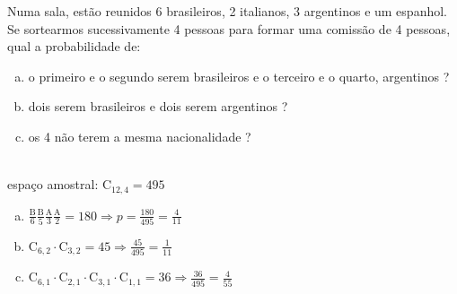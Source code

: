 \begin{ex}
	Numa sala, estão reunidos 6 brasileiros, 2 italianos, 3 argentinos e um espanhol. Se sortearmos sucessivamente 4 pessoas para formar uma comissão de 4 pessoas, qual a probabilidade de: 
    \begin{enumerate}[(a)]
    \item o primeiro e o segundo serem brasileiros e o terceiro e o quarto, argentinos ?
    \item  dois serem brasileiros e dois serem argentinos ?
    \item  os 4 não terem a mesma nacionalidade ?
    \end{enumerate}
      \begin{sol}
      \phantom{A}   \\
      espaço amostral: $\mathrm{C}_{{12},4}=495$
        \begin{enumerate}  [(a)]
            \item $\frac{\mathrm{B}}{6}\frac{\mathrm{B}}{5}\frac{\mathrm{A}}{3}\frac{\mathrm{A}}{2}= 180\Longrightarrow p=\frac{180}{495}=\frac{4}{11}$
            \item $\mathrm{C}_{6,2}\cdot\mathrm{C}_{3,2}=45\Longrightarrow \frac{45}{495}=\frac{1}{11}$
            \item $\mathrm{C}_{6,1}\cdot\mathrm{C}_{2,1}\cdot\mathrm{C}_{3,1}\cdot\mathrm{C}_{1,1}=36\Longrightarrow\frac{36}{495}=\frac{4}{55}$
        \end{enumerate}
      \end{sol}
\end{ex}